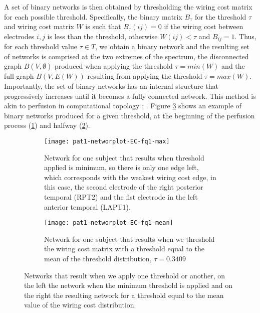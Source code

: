\documentclass[11pt, onecolumn]{article}
\begin{document}
{A set of binary networks is then obtained by thresholding the wiring cost matrix for each possible threshold. Specifically, the binary matrix $B_{\tau}$ for the threshold $\tau$ and wiring cost matrix $W$ is such that $B_{\tau}(ij) =0$ if the wiring cost between electrodes $i,j$ is less than the threshold, otherwise $W(ij) < \tau$ and $B_{ij}=1$. 
Thus, for each threshold value $\tau \in T$, we obtain a binary network and the resulting set of networks is comprised at the two extremes of the spectrum, the disconnected graph $B(V,\emptyset)$ produced when applying the threshold $\tau = min(W)$ and the full graph $B(V,E(W))$ resulting from applying the threshold $\tau = max(W)$. 
Importantly, the set of binary networks has an internal structure that progressively increases until it becomes a fully connected network. This method is akin to perfusion in computational topology \citep{dabaghian2014reconceiving}; \citep{dotko2016topological}. 
Figure \ref{fig:binaryplotnetwork} shows an example of binary networks produced for a given threshold, at the beginning of the perfusion process (\ref{binaryplotnetwork:a}) and halfway (\ref{binaryplotnetwork:b}). 

\begin{figure}[ht] 
  \begin{subfigure}[t]{0.5\linewidth}
    \centering
    \texttt{[image: pat1-networplot-EC-fq1-max]} 
    \caption{Network for one subject that results when  threshold applied is minimum, so there is only one edge left, which corresponds with the weakest wiring cost edge, in this case, the second electrode of the right posterior temporal (RPT2) and the fist electrode in the left anterior temporal (LAPT1).} 
    \label{binaryplotnetwork:a} 
    \vspace{4ex}
  \end{subfigure}%
  \hspace{1ex}
  \begin{subfigure}[t]{0.5\linewidth}
    \centering
    \texttt{[image: pat1-networplot-EC-fq1-mean]} 
    \caption{Network for one subject that results when we threshold the wiring cost matrix with a threshold equal to the mean of the threshold distribution, $\tau =  0.3409$}
    \label{binaryplotnetwork:b} 
    \vspace{4ex}
  \end{subfigure} 
  \caption{Networks that result when we apply one threshold or another, on the left the network when the minimum threshold is applied
and on the right the resulting network for a threshold equal to the mean value of the wiring cost distribution.}
  \label{fig:binaryplotnetwork} 
\end{figure}

}
\end{document}
